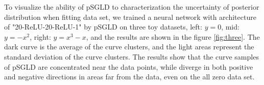 To visualize the ability of pSGLD to characterization the uncertainty of posterior distribution when fitting data set, we trained a neural network with architecture of "20-ReLU-20-ReLU-1" by pSGLD on three toy datasets, left: $y=0$, mid: $y=-x^2$, right: $y=x^3-x$, and the results are shown in the figure \ref{fig:three}. The dark curve is the average of the curve clusters, and the light areas represent the standard deviation of the curve clusters. The results show that the curve samples of pSGLD are concentrated near the data points, while diverge in both positive and negative directions in areas far from the data, even on the all zero data set.

